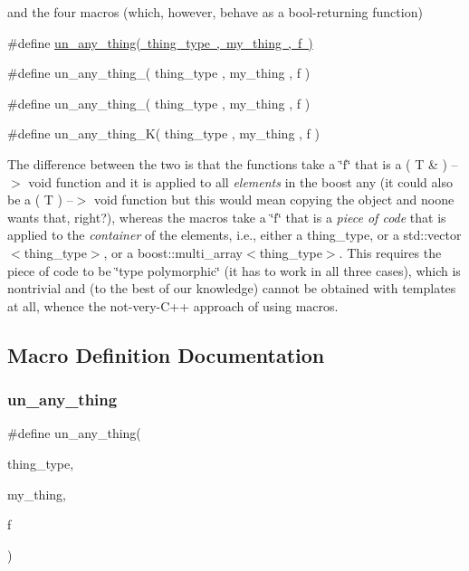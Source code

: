 and the four macros (which, however, behave as a bool-\/returning function)

\#define \mbox{\hyperlink{group__boost__any__stuff_gab299af634bc1ca9be3a8d45a14560036}{un\+\_\+any\+\_\+thing( thing\+\_\+type , my\+\_\+thing , f )}}

\#define un\+\_\+any\+\_\+thing\+\_( thing\+\_\+type , my\+\_\+thing , f )

\#define un\+\_\+any\+\_\+thing\+\_( thing\+\_\+type , my\+\_\+thing , f )

\#define un\+\_\+any\+\_\+thing\+\_\+\+K( thing\+\_\+type , my\+\_\+thing , f )

The difference between the two is that the functions take a \char`\"{}f\char`\"{} that is a ( T \& ) --$>$ void function and it is applied to all {\itshape elements} in the boost any (it could also be a ( T ) --$>$ void function but this would mean copying the object and noone wants that, right?), whereas the macros take a \char`\"{}f\char`\"{} that is a {\itshape piece of code} that is applied to the {\itshape container} of the elements, i.\+e., either a thing\+\_\+type, or a std\+::vector$<$thing\+\_\+type$>$, or a boost\+::multi\+\_\+array$<$thing\+\_\+type$>$. This requires the piece of code to be \char`\"{}type polymorphic\char`\"{} (it has to work in all three cases), which is nontrivial and (to the best of our knowledge) cannot be obtained with templates at all, whence the not-\/very-\/\+C++ approach of using macros. 

\subsection{Macro Definition Documentation}
\mbox{\label{group__boost__any__stuff_gab299af634bc1ca9be3a8d45a14560036}} 
\subsubsection{\texorpdfstring{un\+\_\+any\+\_\+thing}{un\_any\_thing}}
{\footnotesize\ttfamily \#define un\+\_\+any\+\_\+thing(\begin{DoxyParamCaption}\item[{}]{thing\+\_\+type,  }\item[{}]{my\+\_\+thing,  }\item[{}]{f }\end{DoxyParamCaption})}

